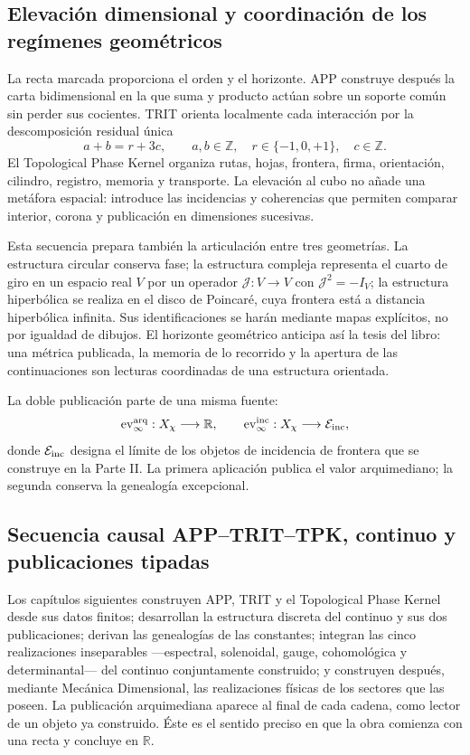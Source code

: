 \subsection*{Elevación dimensional y coordinación de los regímenes geométricos}

La recta marcada proporciona el orden y el horizonte. APP construye después
la carta bidimensional en la que suma y producto actúan sobre un soporte
común sin perder sus cocientes. TRIT orienta localmente cada interacción por
la descomposición residual única
\[
 a+b=r+3c,
 \qquad a,b\in\mathbb Z,\quad
 r\in\{-1,0,+1\},\quad c\in\mathbb Z.
\]
El Topological Phase Kernel organiza rutas, hojas, frontera, firma,
orientación, cilindro, registro, memoria y transporte. La elevación al cubo
no añade una metáfora espacial: introduce las incidencias y coherencias que
permiten comparar interior, corona y publicación en dimensiones sucesivas.

Esta secuencia prepara también la articulación entre tres geometrías. La
estructura circular conserva fase; la estructura compleja representa el
cuarto de giro en un espacio real \(V\) por un operador
\(\mathcal J:V\to V\) con \(\mathcal J^2=-I_V\); la estructura hiperbólica
se realiza en el disco de Poincaré, cuya frontera está a distancia
hiperbólica infinita. Sus identificaciones se harán mediante mapas
explícitos, no por igualdad de dibujos. El horizonte geométrico anticipa así
la tesis del libro: una métrica publicada, la memoria de lo recorrido y la
apertura de las continuaciones son lecturas coordinadas de una estructura
orientada.

La doble publicación parte de una misma fuente:
\[
 \operatorname{ev}^{\rm arq}_\infty:X_\chi\longrightarrow\mathbb R,
 \qquad
 \operatorname{ev}^{\rm inc}_\infty:X_\chi\longrightarrow\mathcal E_{\rm inc},
\]
donde \(\mathcal E_{\rm inc}\) designa el límite de los objetos de incidencia
de frontera que se construye en la Parte II. La primera aplicación publica el
valor arquimediano; la segunda conserva la genealogía excepcional.

\subsection*{Secuencia causal APP–TRIT–TPK, continuo y publicaciones tipadas}

Los capítulos siguientes construyen APP, TRIT y el Topological Phase Kernel
desde sus datos finitos; desarrollan la estructura discreta del continuo y
sus dos publicaciones; derivan las genealogías de las constantes; integran
las cinco realizaciones inseparables —espectral, solenoidal, gauge,
cohomológica y determinantal— del continuo conjuntamente construido; y construyen después,
mediante Mecánica Dimensional, las realizaciones físicas de los sectores que
las poseen. La publicación
arquimediana aparece al final de cada cadena, como lector de un objeto ya
construido. Éste es el sentido preciso en que la obra comienza con una recta
y concluye en \(\mathbb R\).

